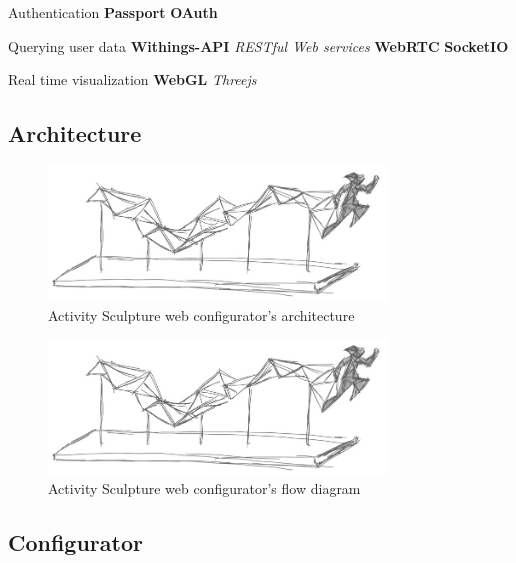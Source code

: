 \documentclass[../medieninformatik-arbeit.tex]{subfiles}
\begin{document}
Authentication 
\textbf{Passport}\cite{passport} 
\textbf{OAuth} \cite{hammer2010oauth}

Querying user data
\textbf{Withings-API}\cite{withingsApi} 
\textit{RESTful Web services} \cite{Fielding:2000:PDM:337180.337228}
\textbf{WebRTC}\cite{webrtc}
\textbf{SocketIO}\cite{socketio} 

Real time visualization
\textbf{WebGL} \textit{Threejs}\cite{cabello2010three}


\subsection{Architecture}

\begin{figure}[h]
\captionsetup{width=0.8\textwidth}
\begin{center}
  \includegraphics[width=0.8\textwidth]{Prototype/img/3DGraph_detail}
  \caption{Activity Sculpture web configurator's architecture}
\label{fig:architecture}
\end{center}
\end{figure}

\begin{figure}[h]
\captionsetup{width=0.8\textwidth}
\begin{center}
  \includegraphics[width=0.8\textwidth]{Prototype/img/3DGraph_detail}
  \caption{Activity Sculpture web configurator's flow diagram}
\label{fig:flowdiagram}
\end{center}
\end{figure}


\subsection{Configurator}
\end{document}
